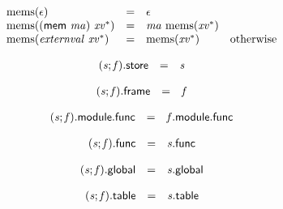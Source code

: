 $$
\begin{array}{@{}lcl@{}l@{}}
{\mathrm{mems}}(\epsilon) &=& \epsilon &  \\
{\mathrm{mems}}((\mathsf{mem}~{\mathit{ma}})~{{\mathit{xv}}^\ast}) &=& {\mathit{ma}}~{\mathrm{mems}}({{\mathit{xv}}^\ast}) &  \\
{\mathrm{mems}}({\mathit{externval}}~{{\mathit{xv}}^\ast}) &=& {\mathrm{mems}}({{\mathit{xv}}^\ast}) &\quad
  \mbox{otherwise} \\
\end{array}
$$

\vspace{1ex}

\vspace{1ex}

$$
\begin{array}{@{}lcl@{}l@{}}
({\mathit{s}} ; {\mathit{f}}).\mathsf{store} &=& {\mathit{s}} &  \\
\end{array}
$$

$$
\begin{array}{@{}lcl@{}l@{}}
({\mathit{s}} ; {\mathit{f}}).\mathsf{frame} &=& {\mathit{f}} &  \\
\end{array}
$$

\vspace{1ex}

$$
\begin{array}{@{}lcl@{}l@{}}
({\mathit{s}} ; {\mathit{f}}).\mathsf{module}.\mathsf{func} &=& {\mathit{f}}.\mathsf{module}.\mathsf{func} &  \\
\end{array}
$$

$$
\begin{array}{@{}lcl@{}l@{}}
({\mathit{s}} ; {\mathit{f}}).\mathsf{func} &=& {\mathit{s}}.\mathsf{func} &  \\
\end{array}
$$

$$
\begin{array}{@{}lcl@{}l@{}}
({\mathit{s}} ; {\mathit{f}}).\mathsf{global} &=& {\mathit{s}}.\mathsf{global} &  \\
\end{array}
$$

$$
\begin{array}{@{}lcl@{}l@{}}
({\mathit{s}} ; {\mathit{f}}).\mathsf{table} &=& {\mathit{s}}.\mathsf{table} &  \\
\end{array}
$$

